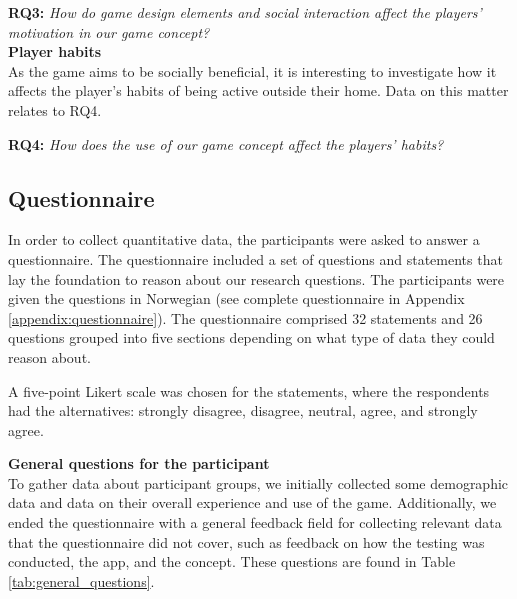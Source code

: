 \textbf{RQ3:} \textit{How do game design elements and social interaction affect the players’ motivation in our game concept?} \\

\textbf{Player habits}\\
As the game aims to be socially beneficial, it is interesting to investigate how it affects the player’s habits of being active outside their home. Data on this matter relates to RQ4.

\textbf{RQ4:} \textit{How does the use of our game concept affect the players’ habits?}

\subsection{Questionnaire}
In order to collect quantitative data, the participants were asked to answer a questionnaire. The questionnaire included a set of questions and statements that lay the foundation to reason about our research questions. The participants were given the questions in Norwegian (see complete questionnaire in Appendix \ref{appendix:questionnaire}). The questionnaire comprised 32 statements and 26 questions grouped into five sections depending on what type of data they could reason about.

A five-point Likert scale was chosen for the statements, where the respondents had the alternatives: strongly disagree, disagree, neutral, agree, and strongly agree.

\textbf{General questions for the participant}\\
To gather data about participant groups, we initially collected some demographic data and data on their overall experience and use of the game. Additionally, we ended the questionnaire with a general feedback field for collecting relevant data that the questionnaire did not cover, such as feedback on how the testing was conducted, the app, and the concept. These questions are found in Table \ref{tab:general_questions}.

